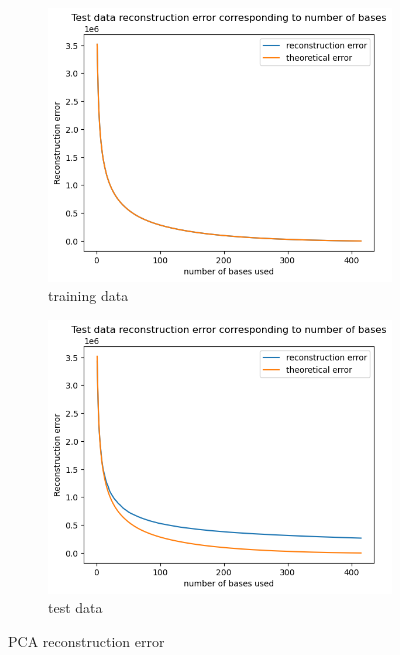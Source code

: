 \begin{figure}[htbp]
	\centering
	\begin{subfigure}[t]{0.4\linewidth}
		\centering
		\includegraphics[width=\linewidth]{image/q1_recon_error_train.png}
		\caption{training data}
		\label{fig:recon_error_train}
	\end{subfigure}%
    \hspace{0.2cm}
	\begin{subfigure}[t]{0.4\linewidth}
		\includegraphics[width=\linewidth]{image/q1_recon_error_test.png}
		\caption{test data}
		\label{fig:recon_error_test}
	\end{subfigure}
	\caption{PCA reconstruction error}
	\label{fig:recon_error}
\end{figure}

